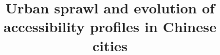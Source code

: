 \documentclass{article}
\begin{document}



\title{Urban sprawl and evolution of accessibility profiles in Chinese cities}



\date{}

\maketitle


\begin{abstract}

\end{abstract}






\end{document}
